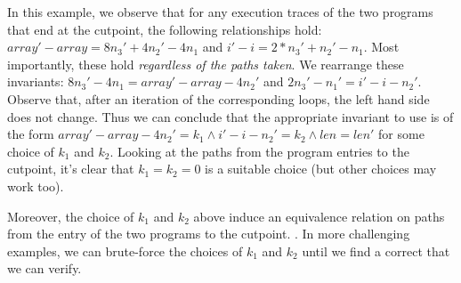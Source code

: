 In this example, we observe that for any execution traces of the two
programs that end at the cutpoint, the following relationships hold:
$array' - array = 8n_3' + 4n_2' - 4n_1$ and $i' - i = 2*n_3' + n_2' -
n_1$.  Most importantly, these hold \emph{regardless of the paths taken}.  We rearrange these invariants: $8n_3' - 4n_1 = array' - array
- 4n_2'$ and $2n_3' - n_1' = i' - i - n_2'$.  Observe that, after
an iteration of the corresponding loops, the left hand side does not
change. Thus we can conclude that the appropriate invariant to use is
of the form $array' - array - 4n_2' = k_1 \wedge i' - i - n_2' = k_2
\wedge len = len'$ for some choice of $k_1$ and $k_2$. Looking at the
paths from the program entries to the cutpoint, it's clear that $k_1
= k_2 = 0$ is a suitable choice (but other choices may work
too).

Moreover, the choice of $k_1$ and $k_2$ above induce an equivalence
relation on paths from the entry of the two programs to the cutpoint.
. In more challenging examples, we
can brute-force the choices of $k_1$ and $k_2$ until we find a correct
\bisimrep{} that we can verify.

